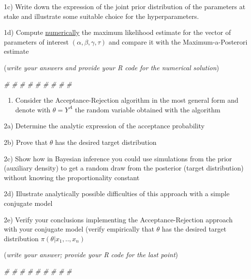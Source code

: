 \documentclass[]{article}
\newenvironment{Shaded}{\begin{snugshade}}{\end{snugshade}}
\newcommand{\CommentTok}[1]{\textcolor[rgb]{0.56,0.35,0.01}{\textit{#1}}}
\providecommand{\tightlist}{%
  \setlength{\itemsep}{0pt}\setlength{\parskip}{0pt}}
\begin{document}
1c) Write down the expression of the joint prior distribution of the
parameters at stake and illustrate some suitable choice for the
hyperparameters.

1d) Compute \underline{numerically} the maximum likelihood estimate for
the vector of parameters of interest
\((\alpha , \beta , \gamma , \tau)\) and compare it with the
Maximum-a-Posterori estimate

(\emph{write your answers and provide your R code for the numerical
solution})

\begin{Shaded}
\begin{Highlighting}[]
\CommentTok{#}
\CommentTok{#}
\CommentTok{#}
\CommentTok{#}
\CommentTok{#}
\CommentTok{#}
\CommentTok{#}
\CommentTok{#}
\CommentTok{#}
\end{Highlighting}
\end{Shaded}

\newpage

\begin{enumerate}
\def\labelenumi{\arabic{enumi})}
\setcounter{enumi}{1}
\tightlist
\item
  Consider the Acceptance-Rejection algorithm in the most general form
  and denote with \(\theta=Y^A\) the random variable obtained with the
  algorithm
\end{enumerate}

2a) Determine the analytic expression of the acceptance probability

2b) Prove that \(\theta\) has the desired target distribution

2c) Show how in Bayesian inference you could use simulations from the
prior (auxiliary density) to get a random draw from the posterior
(target distribution) without knowing the proportionality constant

2d) Illustrate analytically possible difficulties of this approach with
a simple conjugate model

2e) Verify your conclusions implementing the Acceptance-Rejection
approach with your conjugate model (verify empirically that \(\theta\)
has the desired target distribution \(\pi(\theta|x_1,..,x_n)\)

(\emph{write your answer; provide your R code for the last point})

\begin{Shaded}
\begin{Highlighting}[]
\CommentTok{#}
\CommentTok{#}
\CommentTok{#}
\CommentTok{#}
\CommentTok{#}
\CommentTok{#}
\CommentTok{#}
\CommentTok{#}
\CommentTok{#}
\end{Highlighting}
\end{Shaded}
\end{document}
